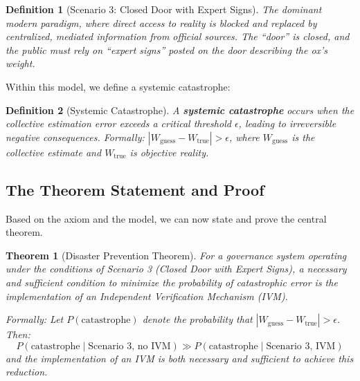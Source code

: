 \documentclass[11pt,a4paper]{article}
\newtheorem{theorem}{Theorem}[section]
\newtheorem{definition}{Definition}[section]
\begin{document}
\begin{definition}[Scenario 3: Closed Door with Expert Signs]
The dominant modern paradigm, where direct access to reality is blocked and replaced by centralized, mediated information from official sources. The ``door'' is closed, and the public must rely on ``expert signs'' posted on the door describing the ox's weight.
\end{definition}

Within this model, we define a systemic catastrophe:

\begin{definition}[Systemic Catastrophe]
A \textbf{systemic catastrophe} occurs when the collective estimation error exceeds a critical threshold $\epsilon$, leading to irreversible negative consequences. Formally: $|W_{\text{guess}} - W_{\text{true}}| > \epsilon$, where $W_{\text{guess}}$ is the collective estimate and $W_{\text{true}}$ is objective reality.
\end{definition}

\subsection{The Theorem Statement and Proof}

Based on the axiom and the model, we can now state and prove the central theorem.

\begin{theorem}[Disaster Prevention Theorem]
For a governance system operating under the conditions of Scenario 3 (Closed Door with Expert Signs), a necessary and sufficient condition to minimize the probability of catastrophic error is the implementation of an Independent Verification Mechanism (IVM).

Formally: Let $P(\text{catastrophe})$ denote the probability that $|W_{\text{guess}} - W_{\text{true}}| > \epsilon$. Then:
\begin{equation}
P(\text{catastrophe} \mid \text{Scenario 3, no IVM}) \gg P(\text{catastrophe} \mid \text{Scenario 3, IVM})
\end{equation}
and the implementation of an IVM is both necessary and sufficient to achieve this reduction.
\end{theorem}
\end{document}
